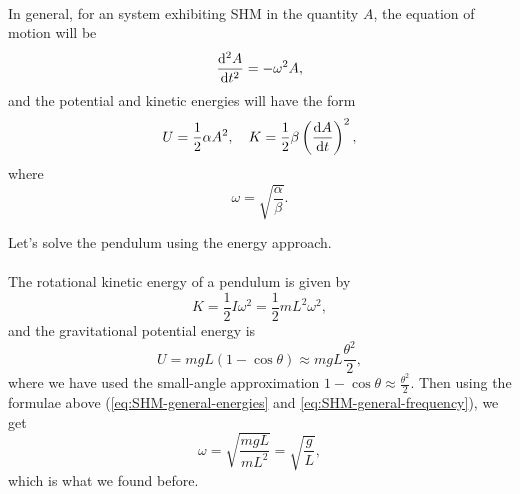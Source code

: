 \documentclass[../classical_mechanics.tex]{subfiles}
\begin{document}
        \paragraph{}
        In general, for an system exhibiting SHM in the quantity $A$, the equation of motion will be
        \begin{equation}
            \dv[2]{A}{t}=-\omega^2A,
        \end{equation}
        and the potential and kinetic energies will have the form
        \begin{equation}\label{eq:SHM-general-energies}
            U=\frac{1}{2}\alpha A^2,\quad K=\frac{1}{2}\beta\left(\dv{A}{t}\right)^2,
        \end{equation}
        where
        \begin{equation}\label{eq:SHM-general-frequency}
            \omega=\sqrt{\frac{\alpha}{\beta}}.
        \end{equation}
        \begin{example}
            Let's solve the pendulum using the energy approach.

            \paragraph{}
            The rotational kinetic energy of a pendulum is given by
            \begin{equation}
                K=\frac{1}{2}I\omega^2=\frac{1}{2}mL^2\omega^2,
            \end{equation}
            and the gravitational potential energy is
            \begin{equation}
                U=mgL(1-\cos\theta)\approx mgL\frac{\theta^2}{2},
            \end{equation}
            where we have used the small-angle approximation $1-\cos\theta\approx\frac{\theta^2}{2}$.
            Then using the formulae above (\ref{eq:SHM-general-energies} and \ref{eq:SHM-general-frequency}), we get
            \begin{equation}
                \omega=\sqrt{\frac{mgL}{mL^2}}=\sqrt{\frac{g}{L}},
            \end{equation}
            which is what we found before.
        \end{example}
        
\end{document}
